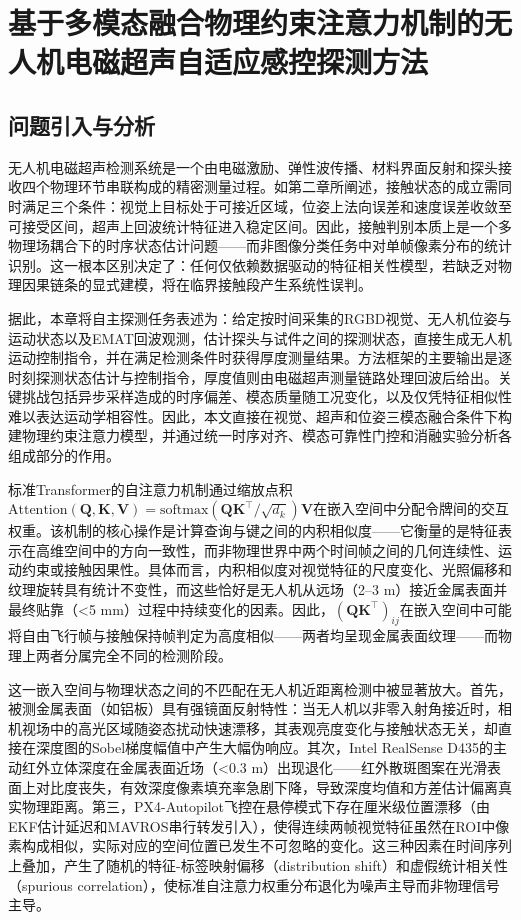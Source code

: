 \chapter{基于多模态融合物理约束注意力机制的无人机电磁超声自适应感控探测方法}

\section{问题引入与分析}

无人机电磁超声检测系统是一个由电磁激励、弹性波传播、材料界面反射和探头接收四个物理环节串联构成的精密测量过程。如第二章所阐述，接触状态的成立需同时满足三个条件：视觉上目标处于可接近区域，位姿上法向误差和速度误差收敛至可接受区间，超声上回波统计特征进入稳定区间。因此，接触判别本质上是一个多物理场耦合下的时序状态估计问题——而非图像分类任务中对单帧像素分布的统计识别。这一根本区别决定了：任何仅依赖数据驱动的特征相关性模型，若缺乏对物理因果链条的显式建模，将在临界接触段产生系统性误判。

据此，本章将自主探测任务表述为：给定按时间采集的RGBD视觉、无人机位姿与运动状态以及EMAT回波观测，估计探头与试件之间的探测状态，直接生成无人机运动控制指令，并在满足检测条件时获得厚度测量结果。方法框架的主要输出是逐时刻探测状态估计与控制指令，厚度值则由电磁超声测量链路处理回波后给出。关键挑战包括异步采样造成的时序偏差、模态质量随工况变化，以及仅凭特征相似性难以表达运动学相容性。因此，本文直接在视觉、超声和位姿三模态融合条件下构建物理约束注意力模型，并通过统一时序对齐、模态可靠性门控和消融实验分析各组成部分的作用。

标准Transformer的自注意力机制\cite{vaswani2017attention}通过缩放点积$\text{Attention}(\mathbf{Q}, \mathbf{K}, \mathbf{V}) = \text{softmax}(\mathbf{Q}\mathbf{K}^\top/\sqrt{d_k})\mathbf{V}$在嵌入空间中分配令牌间的交互权重。该机制的核心操作是计算查询与键之间的内积相似度——它衡量的是特征表示在高维空间中的方向一致性，而非物理世界中两个时间帧之间的几何连续性、运动约束或接触因果性。具体而言，内积相似度对视觉特征的尺度变化、光照偏移和纹理旋转具有统计不变性，而这些恰好是无人机从远场（2--3 m）接近金属表面并最终贴靠（<5 mm）过程中持续变化的因素。因此，$(\mathbf{Q}\mathbf{K}^\top)_{ij}$在嵌入空间中可能将自由飞行帧与接触保持帧判定为高度相似——两者均呈现金属表面纹理——而物理上两者分属完全不同的检测阶段。

这一嵌入空间与物理状态之间的不匹配在无人机近距离检测中被显著放大。首先，被测金属表面（如铝板）具有强镜面反射特性：当无人机以非零入射角接近时，相机视场中的高光区域随姿态扰动快速漂移，其表观亮度变化与接触状态无关，却直接在深度图的Sobel梯度幅值中产生大幅伪响应。其次，Intel RealSense D435的主动红外立体深度在金属表面近场（<0.3 m）出现退化——红外散斑图案在光滑表面上对比度丧失，有效深度像素填充率急剧下降，导致深度均值和方差估计偏离真实物理距离。第三，PX4-Autopilot飞控在悬停模式下存在厘米级位置漂移（由EKF估计延迟和MAVROS串行转发引入），使得连续两帧视觉特征虽然在ROI中像素构成相似，实际对应的空间位置已发生不可忽略的变化。这三种因素在时间序列上叠加，产生了随机的特征-标签映射偏移（distribution shift）和虚假统计相关性（spurious correlation），使标准自注意力权重分布退化为噪声主导而非物理信号主导。

